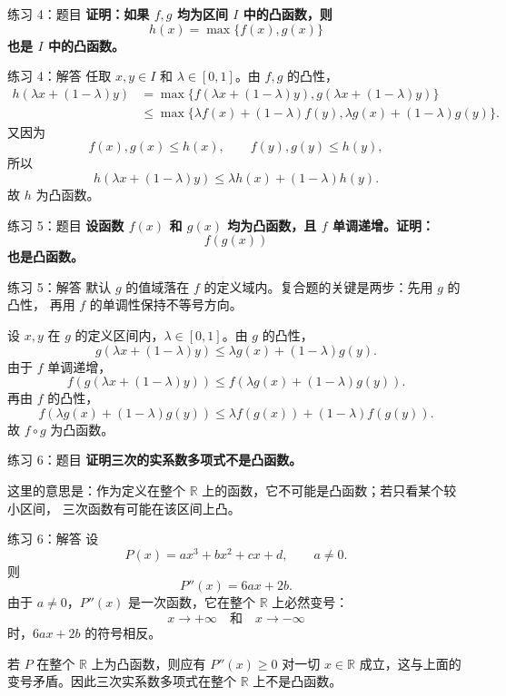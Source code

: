 \documentclass[aspectratio=169,11pt]{ctexbeamer}
\newcommand{\R}{\mathbb{R}}
\begin{document}
\begin{frame}{练习 4：题目}
\small
\textbf{证明：如果 $f,g$ 均为区间 $I$ 中的凸函数，则}
\[
  h(x)=\max\{f(x),g(x)\}
\]
\textbf{也是 $I$ 中的凸函数。}
\end{frame}

\begin{frame}{练习 4：解答}
\small
任取 $x,y\in I$ 和 $\lambda\in[0,1]$。由 $f,g$ 的凸性，
\[
\begin{aligned}
h(\lambda x+(1-\lambda)y)
&=\max\{f(\lambda x+(1-\lambda)y),g(\lambda x+(1-\lambda)y)\}\\
&\le \max\{\lambda f(x)+(1-\lambda)f(y),
           \lambda g(x)+(1-\lambda)g(y)\}.
\end{aligned}
\]
又因为
\[
  f(x),g(x)\le h(x),\qquad f(y),g(y)\le h(y),
\]
所以
\[
  h(\lambda x+(1-\lambda)y)
  \le \lambda h(x)+(1-\lambda)h(y).
\]
故 $h$ 为凸函数。
\end{frame}

\begin{frame}{练习 5：题目}
\small
\textbf{设函数 $f(x)$ 和 $g(x)$ 均为凸函数，且 $f$ 单调递增。证明：}
\[
  f(g(x))
\]
\textbf{也是凸函数。}
\end{frame}

\begin{frame}{练习 5：解答}
\small
默认 $g$ 的值域落在 $f$ 的定义域内。复合题的关键是两步：先用 $g$ 的凸性，
再用 $f$ 的单调性保持不等号方向。

设 $x,y$ 在 $g$ 的定义区间内，$\lambda\in[0,1]$。由 $g$ 的凸性，
\[
  g(\lambda x+(1-\lambda)y)
  \le
  \lambda g(x)+(1-\lambda)g(y).
\]
由于 $f$ 单调递增，
\[
  f(g(\lambda x+(1-\lambda)y))
  \le
  f(\lambda g(x)+(1-\lambda)g(y)).
\]
再由 $f$ 的凸性，
\[
  f(\lambda g(x)+(1-\lambda)g(y))
  \le
  \lambda f(g(x))+(1-\lambda)f(g(y)).
\]
故 $f\circ g$ 为凸函数。
\end{frame}

\begin{frame}{练习 6：题目}
\small
\textbf{证明三次的实系数多项式不是凸函数。}

\vspace{1em}
这里的意思是：作为定义在整个 $\R$ 上的函数，它不可能是凸函数；若只看某个较小区间，
三次函数有可能在该区间上凸。
\end{frame}

\begin{frame}{练习 6：解答}
\small
设
\[
  P(x)=ax^3+bx^2+cx+d,\qquad a\ne0.
\]
则
\[
  P''(x)=6ax+2b.
\]
由于 $a\ne0$，$P''(x)$ 是一次函数，它在整个 $\R$ 上必然变号：
\[
  x\to+\infty \quad\text{和}\quad x\to-\infty
\]
时，$6ax+2b$ 的符号相反。

若 $P$ 在整个 $\R$ 上为凸函数，则应有 $P''(x)\ge0$ 对一切 $x\in\R$
成立，这与上面的变号矛盾。因此三次实系数多项式在整个 $\R$ 上不是凸函数。
\end{frame}
\end{document}
